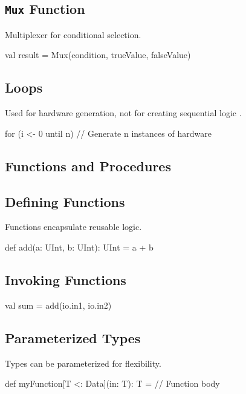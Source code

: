 \subsection{\texttt{Mux} Function}
Multiplexer for conditional selection.
\begin{chiselcode}
val result = Mux(condition, trueValue, falseValue)
\end{chiselcode}

\subsection{Loops}
Used for hardware generation, not for creating sequential logic \cite{chisel-tutorial}.
\begin{chiselcode}
for (i <- 0 until n) {
  // Generate n instances of hardware
}
\end{chiselcode}

\subsection{Functions and Procedures}
\subsection{Defining Functions}
Functions encapsulate reusable logic.
\begin{chiselcode}
def add(a: UInt, b: UInt): UInt = {
  a + b
}
\end{chiselcode}

\subsection{Invoking Functions}
\begin{chiselcode}
val sum = add(io.in1, io.in2)
\end{chiselcode}

\subsection{Parameterized Types}
Types can be parameterized for flexibility.
\begin{chiselcode}
def myFunction[T <: Data](in: T): T = {
  // Function body
}
\end{chiselcode}

